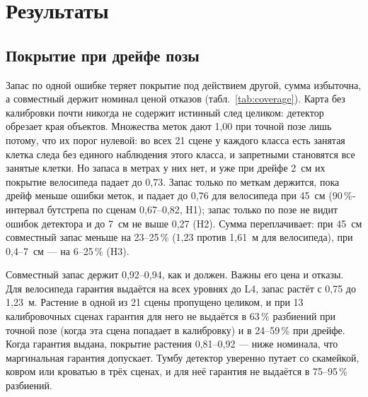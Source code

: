 \documentclass[conference,a4paper]{IEEEtran}
\theoremstyle{definition}
\begin{document}
\section{Результаты}

\begin{table}[t]
\centering
\caption{Покрытие и медианный запас $\hat r$ по 200 разбиениям 13/8, $1 - \alpha = 0{,}9$; медианная ATE L2 --- 2~см,
L3 --- 7~см, L4 --- 45~см. Отказ засчитан как покрытие; $^\dagger$ --- вариант отказывается в половине разбиений или
чаще, приведён запас остальных. Запас только по геометрии отсчитывается от всех занятых клеток.}
\label{tab:coverage}
\footnotesize

\end{table}

\subsection{Покрытие при дрейфе позы}

Запас по одной ошибке теряет покрытие под действием другой, сумма избыточна, а совместный держит номинал ценой отказов
(табл.~\ref{tab:coverage}). Карта без калибровки почти никогда не содержит истинный след целиком: детектор обрезает края
объектов. Множества меток дают 1,00 при точной позе лишь потому, что их порог нулевой: во всех 21 сцене у каждого класса
есть занятая клетка следа без единого наблюдения этого класса, и запретными становятся все занятые клетки. Но запаса в
метрах у них нет, и уже при дрейфе 2~см их покрытие велосипеда падает до 0,73. Запас только по меткам держится, пока
дрейф меньше ошибки меток, и падает до 0,76 для велосипеда при 45~см (90\,\%-интервал бутстрепа по сценам 0,67--0,82,
H1); запас только по позе не видит ошибок детектора и до 7~см не выше 0,27 (H2). Сумма переплачивает: при 45~см
совместный запас меньше на 23--25\,\% (1,23 против 1,61~м для велосипеда), при 0,4--7~см --- на 6--25\,\% (H3).

Совместный запас держит 0,92--0,94, как и должен. Важны его цена и отказы. Для велосипеда гарантия выдаётся на всех
уровнях до L4, запас растёт с 0,75 до 1,23~м. Растение в одной из 21 сцены пропущено целиком, и при 13 калибровочных
сценах гарантия для него не выдаётся в 63\,\% разбиений при точной позе (когда эта сцена попадает в калибровку) и в
24--59\,\% при дрейфе. Когда гарантия выдана, покрытие растения 0,81--0,92 --- ниже номинала, что маргинальная гарантия
допускает. Тумбу детектор уверенно путает со скамейкой, ковром или кроватью в трёх сценах, и для неё гарантия не
выдаётся в 75--95\,\% разбиений.
\end{document}
